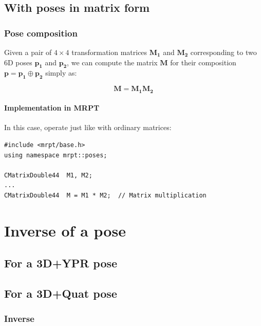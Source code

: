 \documentclass[a4paper,10pt]{report}
\begin{document}
\section{With poses in matrix form}
\label{sect:comp_poses:mat}

\subsection{Pose composition}

Given a pair of $4\times 4$ transformation matrices 
$\mathbf{M_1}$ and $\mathbf{M_2}$ corresponding to two 6D poses
$\mathbf{p_1}$ and $\mathbf{p_2}$, we can compute the 
matrix $\mathbf{M}$ for their composition $\mathbf{p} = \mathbf{p_1} \oplus \mathbf{p_2}$ 
simply as:

\begin{equation}
\mathbf{M} =  \mathbf{M_1}  \mathbf{M_2}
\end{equation}

\subsubsection{Implementation in MRPT}

In this case, operate just like with ordinary matrices:

\begin{lstlisting}
#include <mrpt/base.h> 
using namespace mrpt::poses; 

CMatrixDouble44  M1, M2;
...
CMatrixDouble44  M = M1 * M2;  // Matrix multiplication
\end{lstlisting}



\chapter{Inverse of a pose}
\label{sect:inverse}


\section{For a 3D+YPR pose}


\section{For a 3D+Quat pose}
\label{sect:inverse:quat}

\subsection{Inverse}
\end{document}
